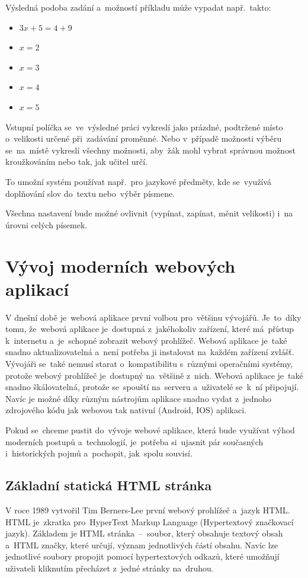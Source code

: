 \documentclass[14pt,a4paper]{article}
\begin{document}
        Výsledná podoba zadání a~možností příkladu může vypadat např.~takto:
        \begin{itemize}
            \item $3x + 5 = 4 + 9$
            \item $x = 2$
            \item $x = 3$
            \item $x = 4$
            \item $x = 5$
        \end{itemize}

        Vstupní políčka se~ve~výsledné práci vykreslí jako prázdné, podtržené místo o~velikosti určené při~zadávání proměnné.
        Nebo v~případě možnosti výběru se~na~místě vykreslí všechny možnosti, aby~žák mohl vybrat správnou možnost kroužkováním nebo tak, jak učitel určí.
        
        To umožní systém používat např.~pro jazykové předměty, kde se~využívá doplňování slov do~textu nebo~výběr písmene.

        Všechna nastavení bude možné ovlivnit (vypínat, zapínat, měnit velikosti) i~na úrovni celých písemek.

    \section{Vývoj moderních webových aplikací}
    V dnešní době je~webová aplikace první volbou pro~většinu vývojářů. Je~to~díky tomu, že~webová aplikace je~dostupná z~jakéhokoliv zařízení,
    které má~přístup k~internetu a~je~schopné zobrazit webový prohlížeč. Webová aplikace je~také snadno aktualizovatelná a~není potřeba ji
    instalovat na~každém zařízení zvlášť. Vývojáři se~také nemusí starat o~kompatibilitu s~různými operačními systémy, protože webový prohlížeč
    je~dostupný na~většině z~nich. Webová aplikace je~také snadno škálovatelná, protože se~spouští na~serveru a~uživatelé se~k~ní připojují.
    Navíc je možné díky různým nástrojům aplikace snadno vydat z~jednoho zdrojového kódu jak webovou tak nativní (Android, IOS) aplikaci.\parencite{adobe:webapp}

    Pokud se~chceme pustit do~vývoje webové aplikace, která bude využívat výhod moderních postupů a~technologií, je~potřeba si~ujasnit pár současných i~historických pojmů a~pochopit, jak~spolu souvisí.

        \subsection{Základní statická HTML stránka}
        V roce 1989 vytvořil Tim Berners-Lee první webový prohlížeč a~jazyk HTML. HTML je~zkratka pro~HyperText Markup Language (Hypertextový značkovací jazyk).
        Základem je HTML stránka~--~soubor, který obsahuje textový obsah a~HTML značky, které určují, význam jednotlivých částí obsahu.
        Navíc lze jednotlivé soubory propojit pomocí hypertextových odkazů, které umožňují uživateli kliknutím přecházet z~jedné stránky na~druhou.
\end{document}
